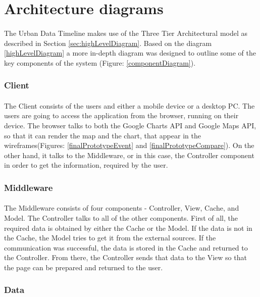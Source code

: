 \documentclass{l4proj}
\begin{document}
\section{Architecture diagrams}
\paragraph{}
The Urban Data Timeline makes use of the Three Tier Architectural model as described in Section \ref{sec:highLevelDiagram}. Based on the diagram \ref{highLevelDiagram} a more in-depth diagram was designed to outline some of the key components of the system (Figure: \ref{componentDiagram}).

\subsubsection{Client}
\paragraph{}
The Client consists of the users and either a mobile device or a desktop PC. The users are going to access the application from the browser, running on their device. The browser talks to both the Google Charts API and Google Maps API, so that it can render the map and the chart, that appear in the wireframes(Figures: \ref{finalPrototypeEvent} and \ref{finalPrototypeCompare}). On the other hand, it talks to the Middleware, or in this case, the Controller component in order to get the information,  required by the user.

\subsubsection{Middleware}
\paragraph{}
The Middleware consists of four components - Controller, View, Cache, and Model. The Controller talks to all of the other components. First of all, the required data is obtained by either the Cache or the Model. If the data is not in the Cache, the Model tries to get it from the external sources. If the communication was successful, the data is stored in the Cache and returned to the Controller. From there, the Controller sends that data to the View so that the page can be prepared and returned to the user. 

\subsubsection{Data}
\end{document}
